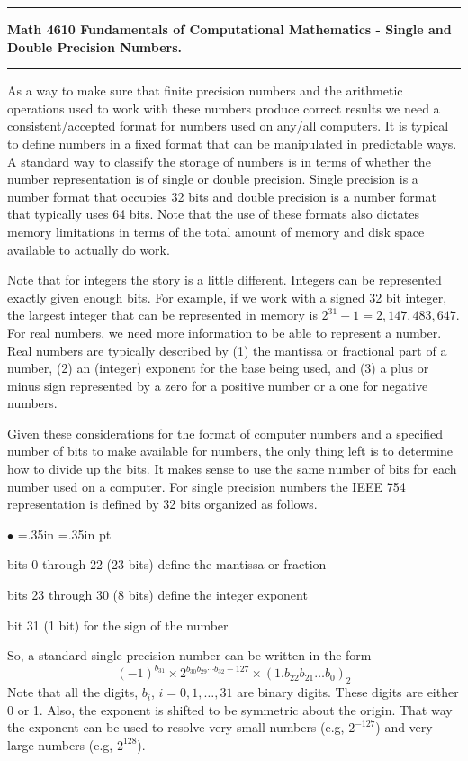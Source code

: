 \documentclass[10pt,fleqn]{article}
\begin{document}
\vskip0.1in\hrule\vskip0.1in
\noindent
{\bf Math 4610 Fundamentals of Computational Mathematics  -  Single and Double
 Precision Numbers.}
\vskip0.1in\hrule\vskip0.1in
\noindent
As a way to make sure that finite precision numbers and the arithmetic
operations used to work with these numbers produce correct results we need a
consistent/accepted format for numbers used on any/all computers. It is typical
to define numbers in a fixed format that can be manipulated in predictable ways.
A standard way to classify the storage of numbers is in terms of whether the
number representation is of single or double precision. Single precision is a
number format that occupies 32 bits and double precision is a number format that
typically uses 64 bits. Note that the use of these formats also dictates memory
limitations in terms of the total amount of memory and disk space available to
actually do work.

Note that for integers the story is a little different. Integers can be
represented exactly given enough bits. For example, if we work with a
signed 32 bit integer, the largest integer that can be represented in memory is
$2^{31}-1=2,147,483,647$. For real numbers, we need more information to be able
to represent a number. Real numbers are typically described by (1) the mantissa
or fractional part of a number, (2) an (integer) exponent for the base being
used, and (3) a plus or minus sign represented by a zero for a positive number
or a one for negative numbers.

Given these considerations for the format of computer numbers and a specified
number of bits to make available for numbers, the only thing left is to
determine how to divide up the bits. It makes sense to use the same number of
bits for each number used on a computer. For single precision numbers the IEEE
754 representation is defined by 32 bits organized as follows.
\begin{list}{$\bullet$}{ \parsep=0pt \listparindent=0pt
\topsep=0pt \rightmargin=.35in \leftmargin=.35in  pt
\itemsep=2pt}
  \item bits 0 through 22 (23 bits) define the mantissa or fraction
  \item bits 23 through 30 (8 bits) define the integer exponent
  \item bit 31 (1 bit) for the sign of the number
\end{list}
So, a standard single precision number can be written in the form
\[
  (-1)^{b_{31}} \times 2^{b_{30}b_{29}\cdots b_{32}-127}
     \times (1.b_{22}b_{21}\ldots b_{0})_2
\]
Note that all the digits, $b_i$, $i=0,1,\ldots,31$ are binary digits. These
digits are either 0 or 1. Also, the exponent is shifted to be symmetric about
the origin. That way the exponent can be used to resolve very small numbers
(e.g, $2^{-127}$) and very large numbers (e.g, $2^{128}$). 
\end{document}
